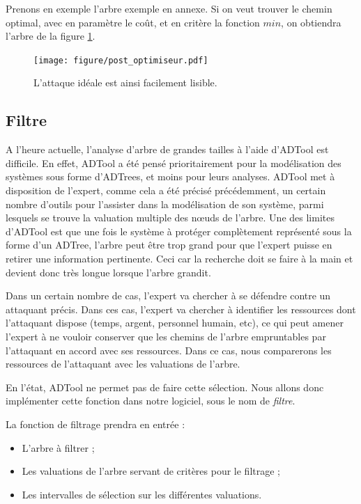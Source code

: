 		Prenons en exemple l'arbre exemple en annexe.
		Si on veut trouver le chemin optimal, avec en paramètre le coût, et en critère la fonction $min$, on obtiendra l'arbre de la figure \ref{fig:arbre_post_opti}.

		\begin{figure}
			\centering
			\texttt{[image: figure/post\_optimiseur.pdf]}
			\caption{L'attaque idéale est ainsi facilement lisible.}
			\label{fig:arbre_post_opti}
		\end{figure}


	\subsection{Filtre}

		A l'heure actuelle, l'analyse d'arbre de grandes tailles à l'aide d'ADTool est difficile. 
		En effet, ADTool a été pensé prioritairement pour la modélisation des systèmes sous forme d'ADTrees, et moins pour leurs analyses. 
		ADTool met à disposition de l'expert, comme cela a été précisé précédemment, un certain nombre d'outils pour l'assister dans la modélisation de son système, parmi lesquels se trouve la valuation multiple des nœuds de l'arbre. 
		Une des limites d'ADTool est que une fois le système à protéger complètement représenté sous la forme d'un ADTree, l'arbre peut être trop grand pour que l'expert puisse en retirer une information pertinente. Ceci car la recherche doit se faire à la main et devient donc très longue lorsque l'arbre grandit. 

		Dans un certain nombre de cas, l'expert va chercher à se défendre contre un attaquant précis. Dans ces cas, l'expert va chercher à identifier les ressources dont l'attaquant dispose (temps, argent, personnel humain, etc), ce qui peut amener l'expert à ne vouloir conserver que les chemins de l'arbre empruntables par l'attaquant en accord avec ses ressources. Dans ce cas, nous comparerons les ressources de l'attaquant avec les valuations de l'arbre.

		En l'état, ADTool ne permet pas de faire cette sélection. Nous allons donc implémenter cette fonction dans notre logiciel, sous le nom de \textit{filtre}.

		La fonction de filtrage prendra en entrée : 
		\begin{itemize}
		\item L'arbre à filtrer ;
		\item Les valuations de l'arbre servant de critères pour le filtrage ;
		\item Les intervalles de sélection sur les différentes valuations.
		\end{itemize}

